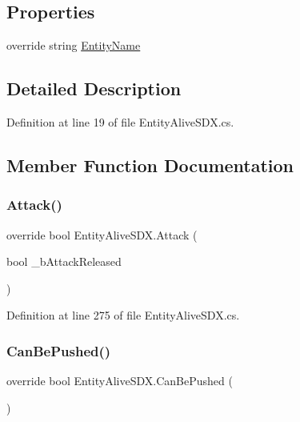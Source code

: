 \subsection*{Properties}
\begin{DoxyCompactItemize}
\item 
override string \mbox{\hyperlink{class_entity_alive_s_d_x_a279eafb6d3356725fc0b71bfd66f7c30}{Entity\+Name}}
\end{DoxyCompactItemize}


\subsection{Detailed Description}


Definition at line 19 of file Entity\+Alive\+S\+D\+X.\+cs.



\subsection{Member Function Documentation}
\mbox{\label{class_entity_alive_s_d_x_a52726dd94c03501cc15602abed4b4b8f}} 
\subsubsection{\texorpdfstring{Attack()}{Attack()}}
{\footnotesize\ttfamily override bool Entity\+Alive\+S\+D\+X.\+Attack (\begin{DoxyParamCaption}\item[{bool}]{\+\_\+b\+Attack\+Released }\end{DoxyParamCaption})}



Definition at line 275 of file Entity\+Alive\+S\+D\+X.\+cs.

\mbox{\label{class_entity_alive_s_d_x_a64e3bfccc3318ae7120574173899a2b1}} 
\subsubsection{\texorpdfstring{CanBePushed()}{CanBePushed()}}
{\footnotesize\ttfamily override bool Entity\+Alive\+S\+D\+X.\+Can\+Be\+Pushed (\begin{DoxyParamCaption}{ }\end{DoxyParamCaption})}



